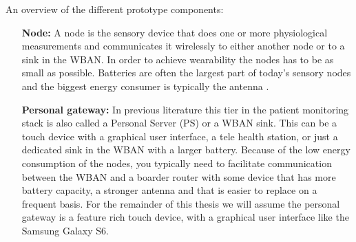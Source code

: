 An overview of the different prototype components:
\begin{itemize}

  \item[\textbf{Node:}] A node is the sensory device that does one or more physiological measurements and communicates it wirelessly to either another node or to a sink in the WBAN. In order to achieve wearability the nodes has to be as small as possible. Batteries are often the largest part of today’s sensory nodes and the biggest energy consumer is typically the antenna \cite{Ullah:2010ci}.


  \item[\textbf{Personal gateway:}] In previous literature this tier in the patient monitoring stack is also called a Personal Server (PS) or a WBAN sink. This can be a touch device with a graphical user interface, a tele health station, or just a dedicated sink in the WBAN with a larger battery. Because of the low energy consumption of the nodes, you typically need to facilitate communication between the WBAN and a boarder router with some device that has more battery capacity, a stronger antenna and that is easier to replace on a frequent basis. For the remainder of this thesis we will assume the personal gateway is a feature rich touch device, with a graphical user interface like the Samsung Galaxy S6.



\end{itemize}
